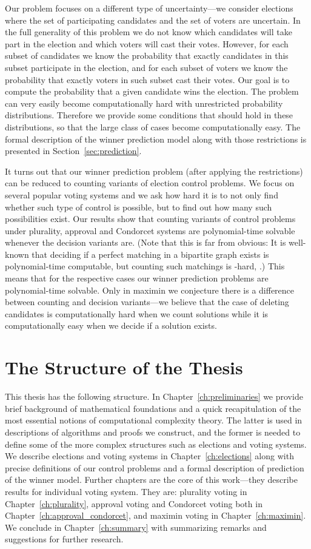 Our problem focuses on a different type of uncertainty---we consider elections where the set of participating candidates and the set of voters are uncertain.
In the full generality of this problem we do not know which candidates will take part in the election and which voters will cast their votes.
However, for each subset of candidates we know the probability that exactly candidates in this subset participate in the election, and for each subset of voters we know the probability that exactly voters in such subset cast their votes.
Our goal is to compute the probability that a given candidate wins the election.
The problem can very easily become computationally hard with unrestricted probability distributions.
Therefore we provide some conditions that should hold in these distributions, so that the large class of cases become computationally easy.
The formal description of the winner prediction model along with those restrictions is presented in Section~\ref{sec:prediction}.

It turns out that our winner prediction problem (after applying the restrictions) can be reduced to counting variants of election control problems.
We focus on several popular voting systems and we ask how hard it is to not only find whether such type of control is possible, but to find out how many such possibilities exist.
Our results show that counting variants of control problems under plurality, approval and Condorcet systems are polynomial-time solvable whenever the decision variants are.
(Note that this is far from obvious: It is well-known that deciding if a perfect matching in a bipartite graph exists is polynomial-time computable, but counting such matchings is \sharpPclass-hard, \cite{valiant}.)
This means that for the respective cases our winner prediction problems are polynomial-time solvable.
Only in maximin we conjecture there is a difference between counting and decision variants---we believe that the case of deleting candidates is computationally hard when we count solutions while it is computationally easy when we decide if a solution exists.

\section{The Structure of the Thesis} \label{sec:structure}

This thesis has the following structure.
In Chapter~\ref{ch:preliminaries} we provide brief background of mathematical foundations and a quick recapitulation of the most essential notions of computational complexity theory.
The latter is used in descriptions of algorithms and proofs we construct, and the former is needed to define some of the more complex structures such as elections and voting systems.
We describe elections and voting systems in Chapter~\ref{ch:elections} along with precise definitions of our control problems and a formal description of prediction of the winner model.
Further chapters are the core of this work---they describe results for individual voting system.
They are: plurality voting in Chapter~\ref{ch:plurality}, approval voting and Condorcet voting both in Chapter~\ref{ch:approval_condorcet}, and maximin voting in Chapter~\ref{ch:maximin}.
We conclude in Chapter~\ref{ch:summary} with summarizing remarks and suggestions for further research.

